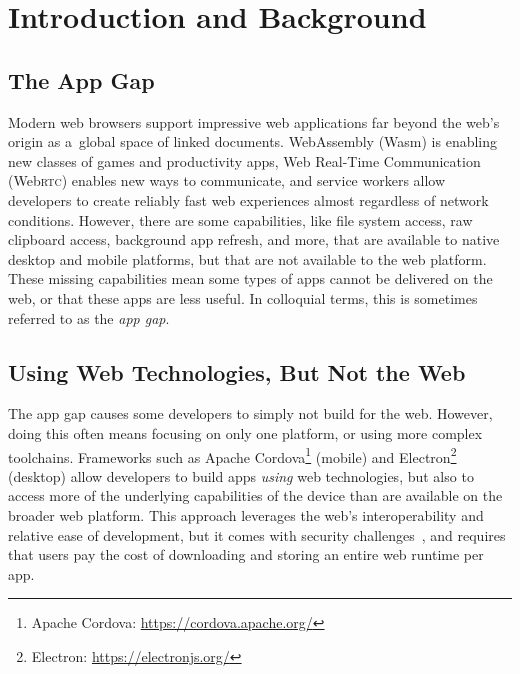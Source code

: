 \documentclass[sigconf]{acmart}
\begin{document}

\maketitle

\section{Introduction and Background}

\subsection{The App Gap}

Modern web browsers support impressive web applications far beyond
the web's origin as a~global space of linked documents.
WebAssembly (Wasm) is enabling new classes of games and productivity apps,
Web Real-Time Communication (Web\textsc{rtc}) enables new ways to communicate,
and service workers allow developers to create reliably fast web experiences
almost regardless of network conditions.
However, there are some capabilities, like file system access,
raw clipboard access, background app refresh, and more,
that are available to native desktop and mobile platforms,
but that are not available to the web platform.
These missing capabilities mean some types of apps cannot be delivered on the web,
or that these apps are less useful.
In colloquial terms, this is sometimes referred to as the \textit{app gap}.

\subsection{Using Web Technologies, But Not the Web}

The app gap causes some developers to simply not build for the web.
However, doing this often means focusing on only one platform,
or using more complex toolchains.
Frameworks such as Apache Cordova\footnote{Apache Cordova:
\url{https://cordova.apache.org/}} (mobile)
and Electron\footnote{Electron: \url{https://electronjs.org/}} (desktop)
allow developers to build apps \textit{using} web technologies,
but also to access more of the underlying capabilities of the device
than are available on the broader web platform.
This approach leverages the web's interoperability and relative ease of development,
but it comes with security challenges~\cite{carettoni17,luo11},
and requires that users pay the cost of downloading and storing an entire web runtime per app.
\end{document}
